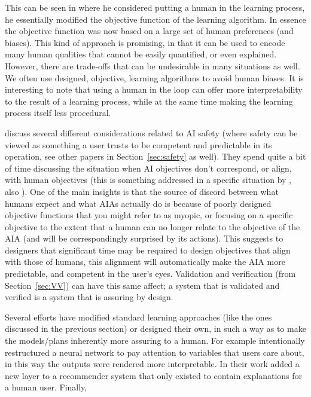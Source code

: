     This can be seen in \citet{Freitas2006-qo} where he considered putting a human in the learning process, he essentially modified the objective function of the learning algorithm. In essence the objective function was now based on a large set of human preferences (and biases). This kind of approach is promising, in that it can be used to encode many human qualities that cannot be easily quantified, or even explained. However, there are trade-offs that can be undesirable in many situations as well. We often use designed, objective, learning algorithms to avoid human biases. It is interesting to note that using a human in the loop can offer more interpretability to the result of a learning process, while at the same time making the learning process itself less procedural.

    \citet{Amodei2016-xi} discuss several different considerations related to AI safety (where safety can be viewed as something a user trusts to be competent and predictable in its operation, see other papers in Section~\ref{sec:safety} as well). They spend quite a bit of time discussing the situation when AI objectives don't correspond, or align, with human objectives (this is something addressed in a specific situation by \cite{Hadfield-Menell2016-ws}, also \cite{Bostrom2012-uf}). One of the main insights is that the source of discord between what humans expect and what AIAs actually do is because of poorly designed objective functions that you might refer to as myopic, or focusing on a specific objective to the extent that a human can no longer relate to the objective of the AIA (and will be correspondingly surprised by its actions). This suggests to designers that significant time may be required to design objectives that align with those of humans, this alignment will automatically make the AIA more predictable, and competent in the user's eyes. Validation and verification (from Section~\ref{sec:VV}) can have this same affect; a system that is validated and verified is a system that is assuring by design.

    Several efforts have modified standard learning approaches (like the ones discussed in the previous section) or designed their own, in such a way as to make the models/plans inherently more assuring to a human. For example \cite{Choi2016-by} intentionally restructured a neural network to pay attention to variables that users care about, in this way the outputs were rendered more interpretable. In their work \cite{Abdollahi2016-vn} added a new layer to a recommender system that only existed to contain explanations for a human user. Finally, \cite{Jovanovic2016-gw,Swartout1983-ko} 

